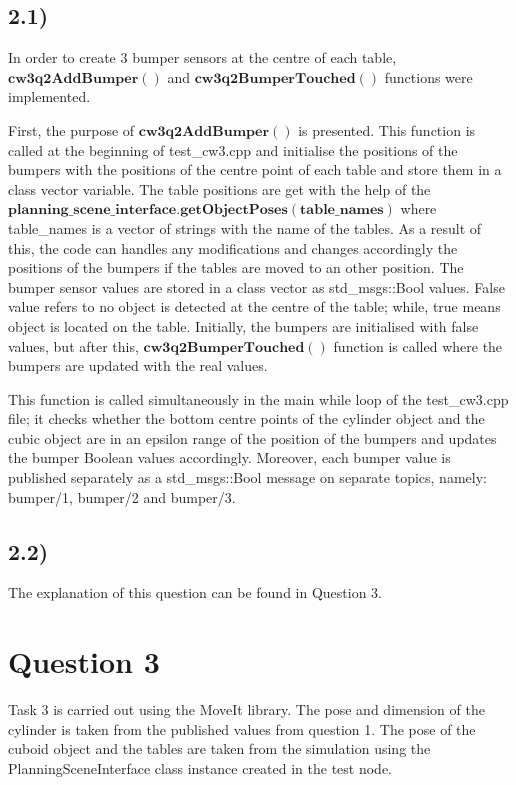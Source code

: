 \documentclass{homework}
\begin{document}
\subsection*{2.1)}


In order to create 3 bumper sensors at the centre of each table, $\boldsymbol{cw3q2AddBumper()}$ and $\boldsymbol{cw3q2BumperTouched()}$ functions were implemented.

First, the purpose of $\boldsymbol{cw3q2AddBumper()}$ is presented. This function is called at the beginning of test\_cw3.cpp and initialise the positions of the bumpers with the positions of the centre point of each table and store them in a class vector variable. The table positions are get with the help of the $\boldsymbol{planning\_scene\_interface.getObjectPoses(table\_names)}$ where table\_names is a vector of strings with the name of the tables. As a result of this, the code can handles any modifications and changes accordingly the positions of the bumpers if the tables are moved to an other position. The bumper sensor values are stored in a class vector as std\_msgs::Bool values. False value refers to no object is detected at the centre of the table; while, true means object is located on the table. Initially, the bumpers are initialised with false values, but after this, $\boldsymbol{cw3q2BumperTouched()}$ function is called where the bumpers are updated with the real values.

This function is called simultaneously in the main while loop of the test\_cw3.cpp file; it checks whether the bottom centre points of the cylinder object and the cubic object are in an epsilon range of the position of the bumpers and updates the bumper Boolean values accordingly. Moreover, each bumper value is published separately as a std\_msgs::Bool message on separate topics, namely: bumper/1, bumper/2 and bumper/3. 
\subsection*{2.2)}
The explanation of this question can be found in Question 3. 
\newpage
\section*{Question 3}
Task 3 is carried out using the MoveIt library. The pose and dimension of the cylinder is taken from the published values from question 1. The pose of the cuboid object and the tables are taken from the simulation using the PlanningSceneInterface class instance created in the test node. 
\end{document}
